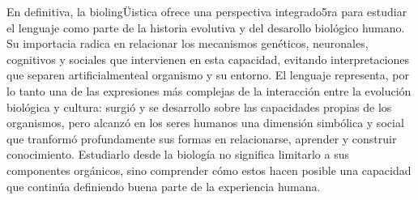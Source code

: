 \documentclass[12pt]{article}
\begin{document}
En definitiva, la biolingÜistica ofrece una perspectiva integrado5ra para estudiar el lenguaje como parte de la historia evolutiva  y del desarollo biológico humano. Su importacia radica en relacionar los mecanismos genéticos, neuronales, cognitivos y sociales que intervienen en esta capacidad, evitando interpretaciones que separen artificialmenteal organismo y su entorno. El lenguaje representa, por lo tanto una de las expresiones más complejas de la interacción entre la evolución biológica y cultura: surgió y se desarrollo  sobre las capacidades propias de los organismos, pero alcanzó en los seres humanos una dimensión simbólica y social que tranformó profundamente sus formas en relacionarse, aprender y construir  conocimiento. Estudiarlo desde la biología  no significa limitarlo  a sus componentes orgánicos, sino comprender cómo estos hacen posible una capacidad que continúa definiendo buena parte de la experiencia humana.
\end{document}
